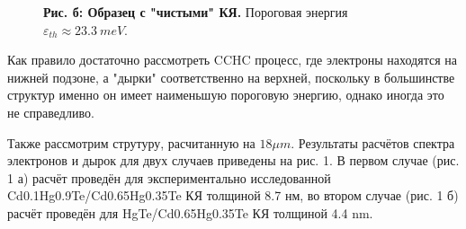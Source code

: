 \documentclass[../main.tex]{subfiles}
\begin{document}
\begin{figure}[h]
\begin{minipage}[h]{0.45\linewidth}
\begin{center}
                \textbf{Рис. б: Образец с "чистыми" КЯ.} Пороговая энергия 
                    $\varepsilon_{th} \approx 23.3~meV$.
            \end{center}
        \end{minipage}
    \end{figure}

    Как правило достаточно рассмотреть CCHC процесс, где электроны находятся на нижней подзоне, а "дырки" соответственно на верхней,
    поскольку в большинстве структур именно он имеет наименьшую пороговую энергию, однако иногда это не справедливо.



    Также рассмотрим струтуру, расчитанную на $18\mu m$. 
    Результаты расчётов спектра электронов и дырок для двух случаев приведены на рис. 1. В первом случае (рис. 1 а) расчёт проведён 
    для экспериментально исследованной Cd0.1Hg0.9Te/Cd0.65Hg0.35Te КЯ толщиной 8.7 нм, во втором случае (рис. 1 б) расчёт проведён для 
    HgTe/Cd0.65Hg0.35Te КЯ толщиной 4.4 nm.
\end{document}
